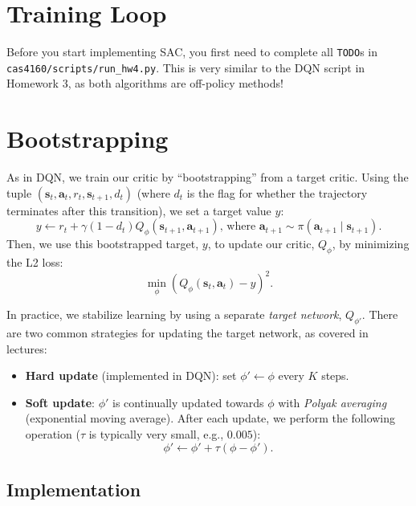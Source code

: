\documentclass{article}
\def\rva{{\mathbf{a}}}
\def\rvs{{\mathbf{s}}}
\begin{document}
\section{Training Loop}

Before you start implementing SAC, you first need to complete all \verb|TODO|s in \verb|cas4160/scripts/run_hw4.py|. This is very similar to the DQN script in Homework 3, as both algorithms are off-policy methods!



\section{Bootstrapping}

As in DQN, we train our critic by ``bootstrapping'' from a target critic. Using the tuple $(\rvs_t, \rva_t, r_t, \rvs_{t+1}, d_{t})$ (where $d_t$ is the flag for whether the trajectory terminates after this transition), we set a target value $y$:
\begin{equation}
    y \gets r_t + \gamma (1-d_t) Q_\phi(\rvs_{t+1}, \rva_{t+1})\text{, where } \rva_{t+1} \sim \pi(\rva_{t+1} \mid \rvs_{t+1}).
\end{equation}
Then, we use this bootstrapped target, $y$, to update our critic, $Q_\phi$, by minimizing the L2 loss:
\begin{equation}
    \min_\phi (Q_\phi(\rvs_t, \rva_t) - y)^2.
\end{equation}

In practice, we stabilize learning by using a separate \textit{target network}, $Q_{\phi'}$. There are two common strategies for updating the target network, as covered in lectures:
\begin{itemize}
    \item \textbf{Hard update} (implemented in DQN): set $\phi' \gets \phi$ every $K$ steps.
    \item \textbf{Soft update}: $\phi'$ is continually updated towards $\phi$ with \textit{Polyak averaging} (exponential moving average). After each update, we perform the following operation ($\tau$ is typically very small, e.g., $0.005$):
    \begin{equation}
        \phi' \gets \phi' + \tau(\phi-\phi').
    \end{equation}
\end{itemize}


\subsection{Implementation}
\end{document}
